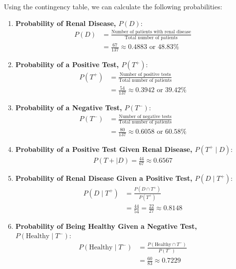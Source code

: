 \begin{solution}
    Using the contingency table, we can calculate the following probabilities:

    \begin{enumerate}[label=(\alph*)]
        \item \textbf{Probability of Renal Disease, \( P(D) \)}:
        \begin{align*}
        P(D) &= \frac{\text{Number of patients with renal disease}}{\text{Total number of patients}} \\
        &= \frac{67}{137} \approx 0.4883 \text{ or } 48.83\%
        \end{align*}
        
        \item \textbf{Probability of a Positive Test, \( P(T^+) \)}:
        \begin{align*}
        P(T^+) &= \frac{\text{Number of positive tests}}{\text{Total number of patients}} \\
        &= \frac{54}{137} \approx 0.3942 \text{ or } 39.42\%
        \end{align*}
        
        \item \textbf{Probability of a Negative Test, \( P(T^-) \)}:
        \begin{align*}
        P(T^-) &= \frac{\text{Number of negative tests}}{\text{Total number of patients}} \\
        &= \frac{80}{137} \approx 0.6058 \text{ or } 60.58\%
        \end{align*}


        \item \textbf{Probability of a Positive Test Given Renal Disease, \( P(T^+ \mid D) \)}:
        \begin{align*}
            P(T+\mid D)=\frac{44}{67} \approx 0.6567
        \end{align*}

        \item \textbf{Probability of Renal Disease Given a Positive Test, \( P(D \mid T^+) \)}:
        \begin{align*}
        P(D \mid T^+) &= \frac{P(D \cap T^+)}{P(T^+)} \\
        &= \frac{44}{54}=\frac{22}{27} \approx 0.8148
        \end{align*}

        \item \textbf{Probability of Being Healthy Given a Negative Test, \( P(\text{Healthy} \mid T^-) \)}:
        \begin{align*}
        P(\text{Healthy} \mid T^-) &= \frac{P(\text{Healthy} \cap T^-)}{P(T^-)} \\
        &= \frac{60}{83} \approx 0.7229
        \end{align*}


\end{enumerate}
\end{solution}
